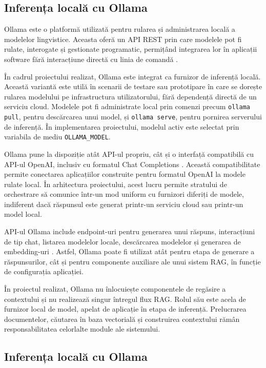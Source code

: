\documentclass[12pt, a4paper, oneside, romanian]{teza-upb}
\begin{document}
\subsection{Inferența locală cu Ollama}

Ollama este o platformă utilizată pentru rularea și administrarea locală a modelelor lingvistice. Aceasta oferă un API REST prin care modelele pot fi rulate, interogate și gestionate programatic, permițând integrarea lor în aplicații software fără interacțiune directă cu linia de comandă \cite{ollama_github,ollama_api}.

În cadrul proiectului realizat, Ollama este integrat ca furnizor de inferență locală. Această variantă este utilă în scenarii de testare sau prototipare în care se dorește rularea modelului pe infrastructura utilizatorului, fără dependență directă de un serviciu cloud. Modelele pot fi administrate local prin comenzi precum \texttt{ollama pull}, pentru descărcarea unui model, și \texttt{ollama serve}, pentru pornirea serverului de inferență. În implementarea proiectului, modelul activ este selectat prin variabila de mediu \texttt{OLLAMA\_MODEL}.

Ollama pune la dispoziție atât API-ul propriu, cât și o interfață compatibilă cu API-ul OpenAI, inclusiv cu formatul Chat Completions \cite{ollama_openai_compatibility}. Această compatibilitate permite conectarea aplicațiilor construite pentru formatul OpenAI la modele rulate local. În arhitectura proiectului, acest lucru permite stratului de orchestrare să comunice într-un mod uniform cu furnizori diferiți de modele, indiferent dacă răspunsul este generat printr-un serviciu cloud sau printr-un model local.

API-ul Ollama include endpoint-uri pentru generarea unui răspuns, interacțiuni de tip chat, listarea modelelor locale, descărcarea modelelor și generarea de embedding-uri \cite{ollama_api}. Astfel, Ollama poate fi utilizat atât pentru etapa de generare a răspunsurilor, cât și pentru componente auxiliare ale unui sistem RAG, în funcție de configurația aplicației.

În proiectul realizat, Ollama nu înlocuiește componentele de regăsire a contextului și nu realizează singur întregul flux RAG. Rolul său este acela de furnizor local de model, apelat de aplicație în etapa de inferență. Prelucrarea documentelor, căutarea în baza vectorială și construirea contextului rămân responsabilitatea celorlalte module ale sistemului.

\subsection{Inferența locală cu Ollama}
\end{document}
